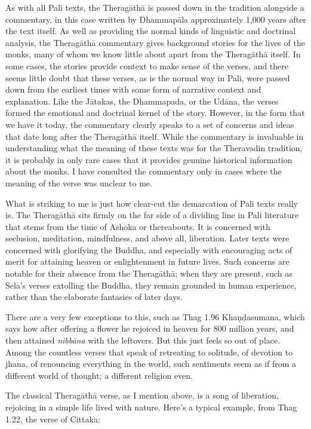 \documentclass[10pt, openany]{book}
\begin{document}
As with all Pali texts, the Thera\-gāthā is passed down in the tradition alongside a commentary, in this case written by Dhammapāla approximately 1,000 years after the text itself. As well as providing the normal kinds of linguistic and doctrinal analysis, the Thera\-gāthā commentary gives background stories for the lives of the monks, many of whom we know little about apart from the Thera\-gāthā itself. In some cases, the stories provide context to make sense of the verses, and there seems little doubt that these verses, as is the normal way in Pali, were passed down from the earliest times with some form of narrative context and explanation. Like the Jātakas, the Dhammapada, or the Udāna, the verses formed the emotional and doctrinal kernel of the story. However, in the form that we have it today, the commentary clearly speaks to a set of concerns and ideas that date long after the Thera\-gāthā itself. While the commentary is invaluable in understanding what the meaning of these texts was for the Theravadin tradition, it is probably in only rare cases that it provides genuine historical information about the monks. I have consulted the commentary only in cases where the meaning of the verse was unclear to me.

What is striking to me is just how clear-cut the demarcation of Pali texts really is. The Thera\-gāthā sits firmly on the far side of a dividing line in Pali literature that stems from the time of Ashoka or thereabouts. It is concerned with seclusion, meditation, mindfulness, and above all, liberation. Later texts were concerned with glorifying the Buddha, and especially with encouraging acts of merit for attaining heaven or enlightenment in future lives. Such concerns are notable for their absence from the Thera\-gāthā; when they are present, such as Sela’s verses extolling the Buddha, they remain grounded in human experience, rather than the elaborate fantasies of later days. 

There are a very few exceptions to this, such as Thag 1.96 Khaṇ\-ḍasumana, which says how after offering a flower he rejoiced in heaven for 800 million years, and then attained \emph{nibbāna} with the leftovers. But this just feels so out of place. Among the countless verses that speak of retreating to solitude, of devotion to jhana, of renouncing everything in the world, such sentiments seem as if from a different world of thought; a different religion even.

The classical Thera\-gāthā verse, as I mention above, is a song of liberation, rejoicing in a simple life lived with nature. Here’s a typical example, from Thag 1.22, the verse of Cittaka:
\end{document}
